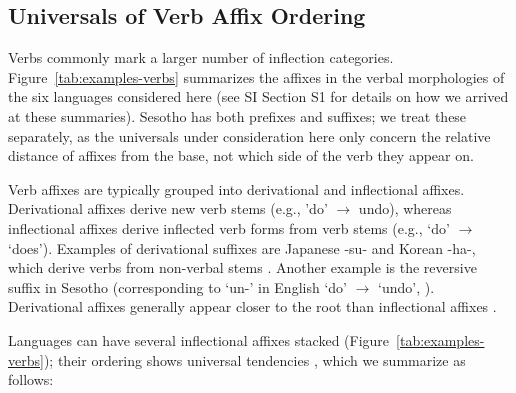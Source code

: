 \documentclass[man]{apa7}
\newcommand{\citep}{\parencite}
\newcommand\mhahn[1]{{\color{red}(#1)}}
\begin{document}


\subsection{Universals of Verb Affix Ordering}\label{sec:univ-verbs}
Verbs commonly mark a larger number of inflection categories.
Figure~\ref{tab:examples-verbs} summarizes the affixes in the verbal morphologies of the six languages considered here (see SI Section S1 for details on how we arrived at these summaries).
Sesotho has both prefixes and suffixes; we treat these separately, as the universals under consideration here only concern the relative distance of affixes from the base, not which side of the verb they appear on.

Verb affixes are typically grouped into derivational and inflectional affixes.
Derivational affixes derive new verb stems (e.g., 'do' $\rightarrow$ undo), whereas inflectional affixes derive inflected verb forms from verb stems (e.g., `do' $\rightarrow$ `does').
Examples of derivational suffixes are Japanese -su- and Korean -ha-, which derive verbs from non-verbal stems \citep{hasegawa2014japanese, yeon2010korean}.
Another example is the reversive suffix in Sesotho (corresponding to `un-' in English `do' $\rightarrow$ `undo', \citep{doke1967textbook}).
Derivational affixes generally appear closer to the root than inflectional affixes \citep{greenberg1963universals}.

Languages can have several inflectional affixes stacked (Figure~\ref{tab:examples-verbs}); their ordering shows universal tendencies \citep{bybee-morphology-1985}, which we summarize as follows:
\end{document}
